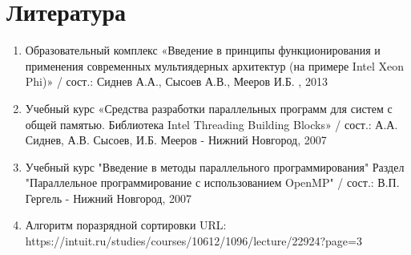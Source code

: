 \documentclass{report}
\begin{document}
\section*{Литература}
\begin{enumerate}
\item Образовательный комплекс «Введение в принципы функционирования и применения современных мультиядерных архитектур (на примере Intel Xeon Phi)» / сост.: Сиднев А.А., Сысоев А.В., Мееров И.Б. , 2013
\item Учебный курс «Средства разработки параллельных программ для систем с общей памятью. Библиотека Intel Threading Building Blocks»  / сост.: А.А. Сиднев, А.В. Сысоев, И.Б. Мееров - Нижний Новгород, 2007 
\item Учебный курс "Введение в методы параллельного программирования" Раздел "Параллельное программирование с использованием OpenMP"  / сост.: В.П. Гергель - Нижний Новгород, 2007 
\item Алгоритм поразрядной сортировки \newline URL: https://intuit.ru/studies/courses/10612/1096/lecture/22924?page=3
\end{enumerate} 
\newpage

\end{document}
